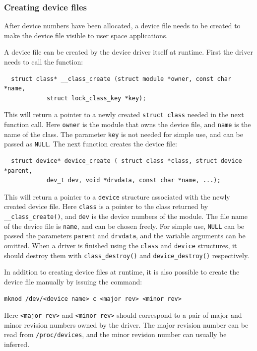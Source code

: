 \subsubsection{Creating device files}
After device numbers have been allocated, a device file needs to be created to make the device file visible to user space applications.

A device file can be created by the device driver itself at runtime. First the driver needs to call the function:
\begin{verbatim}
  struct class* __class_create (struct module *owner, const char *name,
            struct lock_class_key *key);
\end{verbatim}
This will return a pointer to a newly created \texttt{struct class} needed in the next function call. Here \texttt{owner} is the module that owns the device file, and \texttt{name} is the name of the class. The parameter \texttt{key} is not needed for simple use, and can be passed as \texttt{NULL}. The next function creates the device file:
\begin{verbatim}
  struct device* device_create ( struct class *class, struct device *parent,
            dev_t dev, void *drvdata, const char *name, ...);
\end{verbatim}
This will return a pointer to a \texttt{device} structure associated with the newly created device file. Here \texttt{class} is a pointer to the class returned by \texttt{\_\_class\_create()}, and \texttt{dev} is the device numbers of the module. The file name of the device file is \texttt{name}, and can be chosen freely. For simple use, \texttt{NULL} can be passed the parameters \texttt{parent} and \texttt{drvdata}, and the variable arguments can be omitted. When a driver is finished using the \texttt{class} and \texttt{device} structures, it should destroy them with \texttt{class\_destroy()} and \texttt{device\_destroy()} respectively.

In addition to creating device files at runtime, it is also possible to create the device file manually by issuing the command:
\lstset{style=lststyle-terminal}
\begin{lstlisting}
mknod /dev/<device name> c <major rev> <minor rev>
\end{lstlisting}
Here \texttt{<major rev>} and \texttt{<minor rev>} should correspond to a pair of major and minor revision numbers owned by the driver. The major revision number can be read from \texttt{/proc/devices}, and the minor revision number can usually be inferred.

